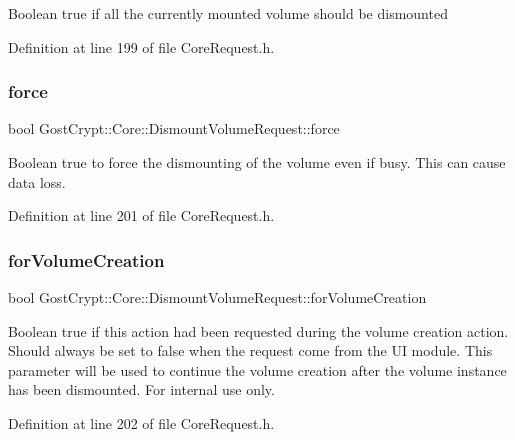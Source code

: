Boolean true if all the currently mounted volume should be dismounted 

Definition at line 199 of file Core\+Request.\+h.

\mbox{\label{struct_gost_crypt_1_1_core_1_1_dismount_volume_request_aeb0eb8d1c39db007b93d67aa0ff19bc1}} 
\subsubsection{\texorpdfstring{force}{force}}
{\footnotesize\ttfamily bool Gost\+Crypt\+::\+Core\+::\+Dismount\+Volume\+Request\+::force}

Boolean true to force the dismounting of the volume even if busy. This can cause data loss. 

Definition at line 201 of file Core\+Request.\+h.

\mbox{\label{struct_gost_crypt_1_1_core_1_1_dismount_volume_request_a92e8de0f0940615170f03aff9a4d340b}} 
\subsubsection{\texorpdfstring{for\+Volume\+Creation}{forVolumeCreation}}
{\footnotesize\ttfamily bool Gost\+Crypt\+::\+Core\+::\+Dismount\+Volume\+Request\+::for\+Volume\+Creation}

Boolean true if this action had been requested during the volume creation action. Should always be set to false when the request come from the UI module. This parameter will be used to continue the volume creation after the volume instance has been dismounted. For internal use only. 

Definition at line 202 of file Core\+Request.\+h.

\mbox{\label{struct_gost_crypt_1_1_core_1_1_dismount_volume_request_a616771872cfd4b04add726e4e4a5856e}} 
